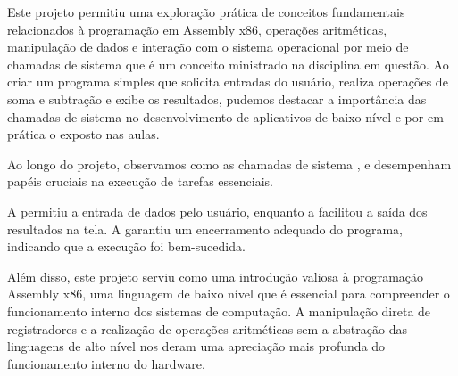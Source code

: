 \documentclass[
	12pt,				%
	openright,			%
	oneside,			%
	a4paper,			%
	chapter=TITLE,		%
	english,			%
	french,				%
	spanish,			%
	brazil				%
	]{abntex2}
\theoremstyle{definition}
\begin{document}
Este projeto permitiu uma exploração prática de conceitos fundamentais relacionados 
à programação em Assembly x86, operações 
aritméticas, manipulação de dados e interação com o sistema operacional por meio de 
chamadas de sistema que é um conceito ministrado na disciplina em questão. 
Ao criar um programa simples que solicita
entradas do usuário, realiza operações de soma e subtração e exibe os resultados, 
pudemos destacar a importância das chamadas de sistema no 
desenvolvimento de aplicativos de baixo nível e por em prática o exposto nas aulas.

Ao longo do projeto, observamos como as chamadas de sistema 
, e 
desempenham papéis cruciais na execução de tarefas essenciais.
 
A  permitiu a entrada de dados pelo usuário, enquanto a  
facilitou a saída dos resultados na tela. A  garantiu um encerramento 
adequado do programa, indicando que a execução foi bem-sucedida.

Além disso, este projeto serviu como uma introdução valiosa à programação Assembly x86, uma 
linguagem de baixo nível que é essencial para compreender o funcionamento interno dos sistemas de 
computação. A manipulação direta de registradores e a realização de operações aritméticas sem a 
abstração das linguagens de alto nível nos deram uma apreciação mais profunda do 
funcionamento interno do hardware.


\postextual



\cite{tanenbaum2010sistemas}
\end{document}
